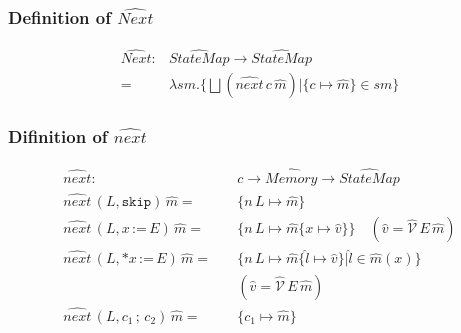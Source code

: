 \documentclass{beamer}
\begin{document}
\begin{frame}
    \frametitle{Definition of $\hat{Next}$ }
    \begin{align*}
        \hat{Next} : & \hat{StateMap} \to \hat{StateMap} \\
                   = & \lambda sm. \{ \bigsqcup (\hat{next} \, c \, \hat{m}) | \{c \mapsto \hat{m}\} \in sm \}
    \end{align*}
\end{frame}

\begin{frame}
    \frametitle{Difinition of $\hat{next}$ }
    \begin{align*}
        \hat{next} : & \quad c \to \hat{Memory} \to \hat{StateMap} \\
        \hat{next} \, (L, \texttt{skip})                            \, \hat{m} = & \quad \{ n \, L \mapsto \hat{m} \} \\
        \hat{next} \, (L, x \, \texttt{:=} \, E)                    \, \hat{m} = & \quad \{ n \, L \mapsto \hat{m}\{x \mapsto \hat{v} \} \}
                                                                                    \quad (\hat{v} = \hat{\mathcal{V}} \, E \, \hat{m}) \\
        \hat{next} \, (L, \texttt{*}x \, \texttt{:=} \, E)          \, \hat{m} = & \quad \{ n \, L \mapsto \hat{m}\{\hat{l} \mapsto \hat{v} \} | \hat{l} \in \hat{m}(x) \} \\
                                                                                 &\quad (\hat{v} = \hat{\mathcal{V}} \, E \, \hat{m})\\
        \hat{next} \, (L, {c}_1 \, ; \, {c}_2)  \, \hat{m} = & \quad \{ {c}_1 \mapsto \hat{m} \} \\
    \end{align*}
\end{frame}
\end{document}
